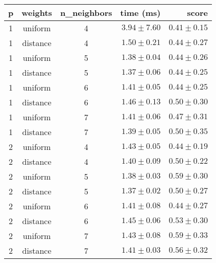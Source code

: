 \begin{tabular}{cccrr}
\toprule
\textbf{p} & \textbf{weights} & \textbf{n\_neighbors} & \textbf{time (ms)} & \textbf{score}\\
\midrule
1 & uniform & 4 & $3.94 \pm 7.60$ & $0.41 \pm 0.15$\\
1 & distance & 4 & $1.50 \pm 0.21$ & $0.44 \pm 0.27$\\
1 & uniform & 5 & $1.38 \pm 0.04$ & $0.44 \pm 0.26$\\
1 & distance & 5 & $1.37 \pm 0.06$ & $0.44 \pm 0.25$\\
1 & uniform & 6 & $1.41 \pm 0.05$ & $0.44 \pm 0.25$\\
1 & distance & 6 & $1.46 \pm 0.13$ & $0.50 \pm 0.30$\\
1 & uniform & 7 & $1.41 \pm 0.06$ & $0.47 \pm 0.31$\\
1 & distance & 7 & $1.39 \pm 0.05$ & $0.50 \pm 0.35$\\
2 & uniform & 4 & $1.43 \pm 0.05$ & $0.44 \pm 0.19$\\
2 & distance & 4 & $1.40 \pm 0.09$ & $0.50 \pm 0.22$\\
2 & uniform & 5 & $1.38 \pm 0.03$ & $0.59 \pm 0.30$\\
2 & distance & 5 & $1.37 \pm 0.02$ & $0.50 \pm 0.27$\\
2 & uniform & 6 & $1.41 \pm 0.08$ & $0.44 \pm 0.27$\\
2 & distance & 6 & $1.45 \pm 0.06$ & $0.53 \pm 0.30$\\
2 & uniform & 7 & $1.43 \pm 0.08$ & $0.59 \pm 0.33$\\
2 & distance & 7 & $1.41 \pm 0.03$ & $0.56 \pm 0.32$\\
\bottomrule
\end{tabular}
